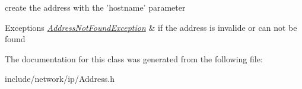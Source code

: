 create the address with the 'hostname' parameter 


\begin{DoxyExceptions}{Exceptions}
{\em \hyperlink{class_f_t_p_1_1_address_not_found_exception}{Address\-Not\-Found\-Exception}} & if the address is invalide or can not be found \\
\hline
\end{DoxyExceptions}


The documentation for this class was generated from the following file\-:\begin{DoxyCompactItemize}
\item 
include/network/ip/Address.\-h\end{DoxyCompactItemize}
